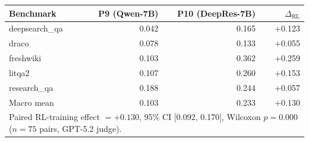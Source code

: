 \begin{tabular}{lrrr}
\toprule
Benchmark & P9 (Qwen-7B) & P10 (DeepRes-7B) & $\Delta_{\mathrm{RL}}$\\
\midrule
deepsearch\_qa & 0.042 & 0.165 & +0.123 \\
draco & 0.078 & 0.133 & +0.055 \\
freshwiki & 0.103 & 0.362 & +0.259 \\
litqa2 & 0.107 & 0.260 & +0.153 \\
research\_qa & 0.188 & 0.244 & +0.057 \\
\midrule
Macro mean & 0.103 & 0.233 & +0.130 \\
\midrule
\multicolumn{4}{l}{\footnotesize Paired RL-training effect $=+0.130$, 95\% CI [0.092, 0.170], Wilcoxon $p=0.000$ ($n=75$ pairs, GPT-5.2 judge).} \\
\bottomrule
\end{tabular}